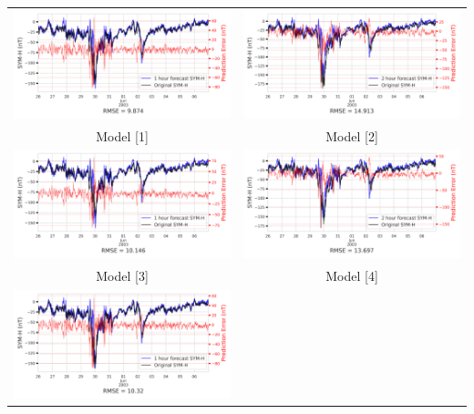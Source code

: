 \documentclass[draft,sw]{agutexSI2019}
\begin{document}
\begin{table}
\centering
\begin{tabular}{cc}
\includegraphics[width=0.49\linewidth]{paper_plots/1h_swics/1h_swics_storm_34.png}
&
\includegraphics[width=0.49\linewidth]{paper_plots/2h_swics/2h_swics_storm_34.png}
\\
Model [1] & Model [2]
\vspace*{12pt}
\\
\includegraphics[width=0.49\linewidth]{paper_plots/1h_no_swics/1h_no_swics_storm_34.png}
&
\includegraphics[width=0.49\linewidth]{paper_plots/2h_no_swics/2h_no_swics_storm_34.png}
\\
Model [3] & Model [4]
\vspace*{12pt}
\\
\includegraphics[width=0.49\linewidth]{paper_plots/1h_swics_model_on_no_swics/1h_swics_model_on_no_swics_storm_34.png}

\end{tabular}
\end{table}
\end{document}
